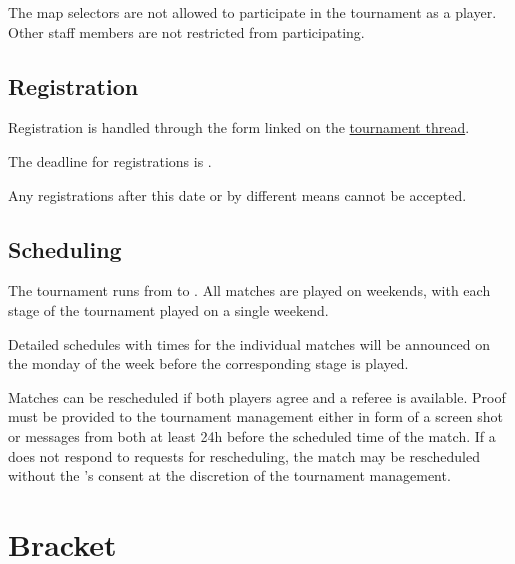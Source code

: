 The map selectors are not allowed to participate in the tournament as a player. Other staff members are not restricted from participating.

\subsection{Registration}

Registration is handled through the form linked on the \href{\thread}{tournament thread}.

The deadline for registrations is \regend.

Any registrations after this date or by different means cannot be accepted.

\customreg

\subsection{Scheduling}

The tournament runs from \tournamentstart{} to \tournamentend. All matches are played on weekends, with each stage of the tournament played on a single weekend.

Detailed schedules with times for the individual matches will be announced on the monday of the week before the corresponding stage is played.

Matches can be rescheduled if both players agree and a referee is available. Proof must be provided to the tournament management either in form of a screen shot or messages from both  at least 24h before the scheduled time of the match.
If a  does not respond to requests for rescheduling, the match may be rescheduled without the 's consent at the discretion of the tournament management.

\customschedule

\section{Bracket}

\custombracketpre

